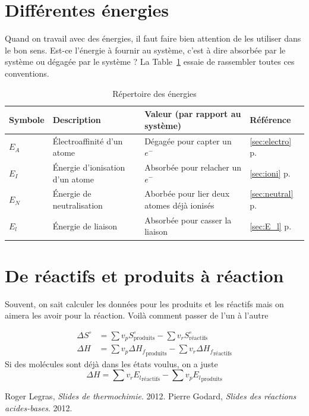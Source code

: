 \documentclass[11pt,a4paper,french]{article}
\begin{document}
\begin{appendices}
\section{Différentes énergies}

Quand on travail avec des énergies, il faut faire bien attention de les utiliser dans le bon sens.
Est-ce l'énergie à fournir au système, c'est à dire absorbée par le système ou dégagée par le système ?
La Table~\ref{tab:energies} essaie de rassembler toutes ces conventions.

\begin{table}[h!]
	\begin{center}
		\begin{tabular}{|p{}|p{}|p{}|p{}|}
			\hline
			Symbole & Description & Valeur (par rapport au système) & Référence\\
			\hline
			$E_A$ & \'Electroaffinité d'un atome & Dégagée pour capter un $e^-$ & \ref{sec:electro} p.~\pageref{sec:electro}\\
			$E_I$ & \'Energie d'ionisation d'un atome & Absorbée pour relacher un $e^-$ & \ref{sec:ioni} p.~\pageref{sec:ioni}\\
			$E_N$ & \'Energie de neutralisation & Aborbée pour lier deux atomes déjà ionisés & \ref{sec:neutral} p.~\pageref{sec:neutral}\\
			$E_l$ & \'Energie de liaison & Absorbée pour casser la liaison & \ref{sec:E_l} p.~\pageref{sec:E_l}\\ %
			\hline
		\end{tabular}
		\caption{Répertoire des énergies}
		\label{tab:energies}
	\end{center}
\end{table}

\section{De réactifs et produits à réaction}
Souvent, on sait calculer les données pour les produits et les réactifs mais on aimera les avoir pour la réaction.
Voilà comment passer de l'un à l'autre

\begin{align*}
	\Delta S^{\circ} &= \sum v_p S^{\circ}_\mathrm{produits} - \sum v_r S^{\circ}_\mathrm{réactifs}\\
	\Delta H &= \sum v_p \Delta {H_f}_\mathrm{produits} - \sum v_r \Delta {H_f}_\mathrm{réactifs}
\end{align*}
Si des molécules sont déjà dans les états voulus, on a juste
\[ \Delta H = \sum v_r{E_l}_\mathrm{réactifs} - \sum v_p{E_l}_\mathrm{produits} \]

\end{appendices}

\begin{thebibliography}{9}
		Roger Legras,
		\emph{Slides de thermochimie}.
		2012.
		Pierre Godard,
		\emph{Slides des réactions acides-bases}.
		2012.
\end{thebibliography}
\end{document}
